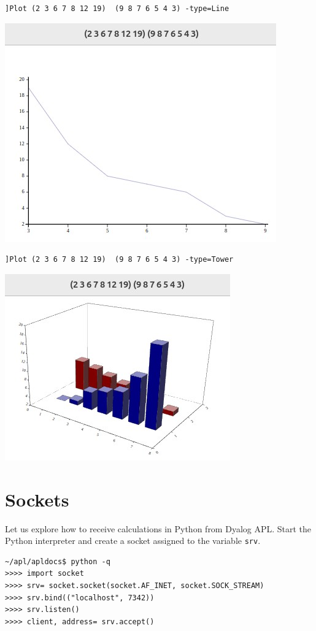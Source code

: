 \documentclass[a4paper,12pt]{book}
\begin{document}
\newpage
\begin{verbatim}
]Plot (2 3 6 7 8 12 19)  (9 8 7 6 5 4 3) -type=Line
\end{verbatim}
\includegraphics{srcfigs/kaplan-meyer-line.jpg}


\begin{verbatim}
]Plot (2 3 6 7 8 12 19)  (9 8 7 6 5 4 3) -type=Tower
\end{verbatim}
\includegraphics{srcfigs/kaplan-meyer-tower.jpg}

\chapter{Sockets}
\large
Let us explore how to receive
calculations in Python from Dyalog APL.
Start the Python interpreter and create
a socket assigned to the variable \verb|srv|.
\begin{verbatim}
~/apl/apldocs$ python -q
>>>> import socket
>>>> srv= socket.socket(socket.AF_INET, socket.SOCK_STREAM)
>>>> srv.bind(("localhost", 7342))
>>>> srv.listen()
>>>> client, address= srv.accept()
\end{verbatim}
\end{document}
